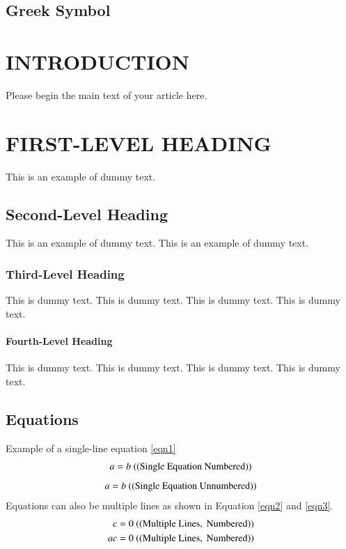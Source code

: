 \documentclass{isabec} %
\begin{document}
\subsection*{Greek Symbol}%
\begin{deflist}
\end{deflist}


\section{INTRODUCTION}
Please begin the main text of your article here.

\section{FIRST-LEVEL HEADING}%
This is an example of dummy text.

\subsection{Second-Level Heading}%
This is an example of dummy text. This is an example of dummy text.

\subsubsection{Third-Level Heading}
This is dummy text. This is dummy text. This is dummy text. This is dummy text. 

\paragraph{Fourth-Level Heading} %
This is dummy text. This is dummy text. This is dummy text. This is dummy text. 

\subsection{Equations}
Example of a single-line equation \ref{eqn1}
\begin{equation}
a = b \ {\rm ((Single\ Equation\ Numbered))}\label{eqn1}
\end{equation}
\[
a = b \ {\rm ((Single\ Equation\ Unnumbered))}
\]
Equations can also be multiple lines as shown in Equation \ref{eqn2} and \ref{eqn3}.
\begin{eqnarray}
c = 0 \ {\rm ((Multiple\  Lines, \ Numbered))}\label{eqn2}\\
ac = 0 \ {\rm ((Multiple \ Lines, \ Numbered))}\label{eqn3}
\end{eqnarray}
\end{document}
